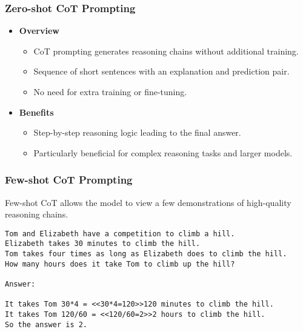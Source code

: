 \begin{frame}[fragile]\frametitle{Zero-shot CoT Prompting}

\begin{itemize}
  \item \textbf{Overview}
    \begin{itemize}
      \item CoT prompting generates reasoning chains without additional training.
      \item Sequence of short sentences with an explanation and prediction pair.
      \item No need for extra training or fine-tuning.
    \end{itemize}

  \item \textbf{Benefits}
    \begin{itemize}
      \item Step-by-step reasoning logic leading to the final answer.
      \item Particularly beneficial for complex reasoning tasks and larger models.
    \end{itemize}
\end{itemize}

\end{frame}

\begin{frame}[fragile]\frametitle{Few-shot CoT Prompting}

Few-shot CoT allows the model to view a few demonstrations of high-quality reasoning chains.

\begin{lstlisting}
Tom and Elizabeth have a competition to climb a hill.
Elizabeth takes 30 minutes to climb the hill.
Tom takes four times as long as Elizabeth does to climb the hill.
How many hours does it take Tom to climb up the hill?

Answer:

It takes Tom 30*4 = <<30*4=120>>120 minutes to climb the hill.
It takes Tom 120/60 = <<120/60=2>>2 hours to climb the hill.
So the answer is 2.

\end{lstlisting} %


\end{frame}

